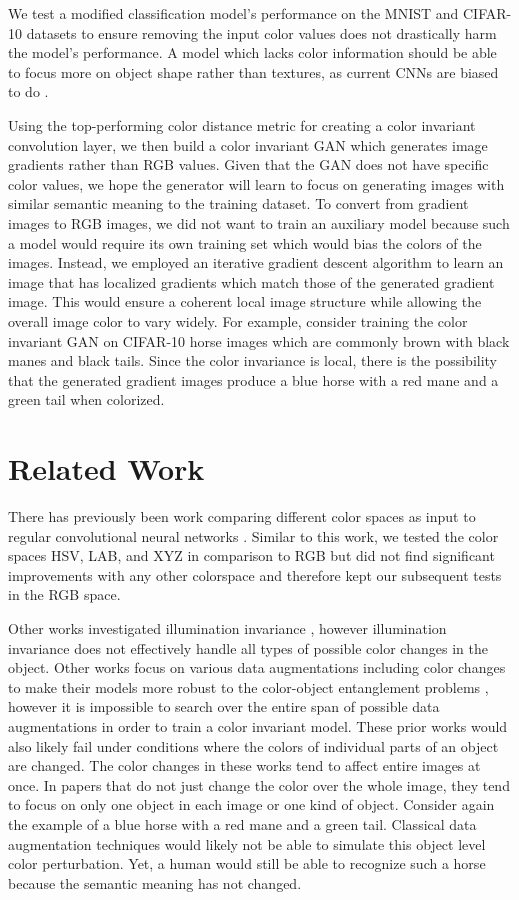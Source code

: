 \documentclass[10pt,twocolumn,letterpaper]{article}
\begin{document}
We test a modified classification model’s performance on the MNIST and CIFAR-10 datasets to ensure removing the input color values does not drastically harm the model’s performance. A model which lacks color information should be able to focus more on object shape rather than textures, as current CNNs are biased to do \cite{Geirhos18}.

Using the top-performing color distance metric for creating a color invariant convolution layer, we then build a color invariant GAN which generates image gradients rather than RGB values. Given that the GAN does not have specific color values, we hope the generator will learn to focus on generating images with similar semantic meaning to the training dataset. To convert from gradient images to RGB images, we did not want to train an auxiliary model because such a model would require its own training set which would bias the colors of the images. Instead, we employed an iterative gradient descent algorithm to learn an image that has localized gradients which match those of the generated gradient image. This would ensure a coherent local image structure while allowing the overall image color to vary widely. For example, consider training the color invariant GAN on CIFAR-10 horse images which are commonly brown with black manes and black tails. Since the color invariance is local, there is the possibility that the generated gradient images produce a blue horse with a red mane and a green tail when colorized.

\section{Related Work}

There has previously been work comparing different color spaces as input to regular convolutional neural networks \cite{Sachin18}. Similar to this work, we tested the color spaces HSV, LAB, and XYZ in comparison to RGB but did not find significant improvements with any other colorspace and therefore kept our subsequent tests in the RGB space.

Other works investigated illumination invariance \cite{Ng08}\cite{Choi10}\cite{Gevers99}, however illumination invariance does not effectively handle all types of possible color changes in the object. Other works focus on various data augmentations including color changes to make their models more robust to the color-object entanglement problems \cite{Xu22}\cite{Zhang16}, however it is impossible to search over the entire span of possible data augmentations in order to train a color invariant model. These prior works would also likely fail under conditions where the colors of individual parts of an object are changed. The color changes in these works tend to affect entire images at once. In papers that do not just change the color over the whole image, they tend to focus on only one object in each image or one kind of object. Consider again the example of a blue horse with a red mane and a green tail. Classical data augmentation techniques would likely not be able to simulate this object level color perturbation. Yet, a human would still be able to recognize such a horse because the semantic meaning has not changed.
\end{document}
